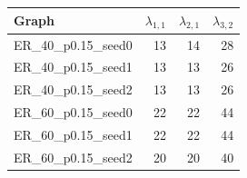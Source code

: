 \begin{tabular}{lrrr}
\toprule
Graph & $\lambda_{1,1}$ & $\lambda_{2,1}$ & $\lambda_{3,2}$ \\
\midrule
ER\_40\_p0.15\_seed0 & 13 & 14 & 28 \\
ER\_40\_p0.15\_seed1 & 13 & 13 & 26 \\
ER\_40\_p0.15\_seed2 & 13 & 13 & 26 \\
ER\_60\_p0.15\_seed0 & 22 & 22 & 44 \\
ER\_60\_p0.15\_seed1 & 22 & 22 & 44 \\
ER\_60\_p0.15\_seed2 & 20 & 20 & 40 \\
\bottomrule
\end{tabular}
